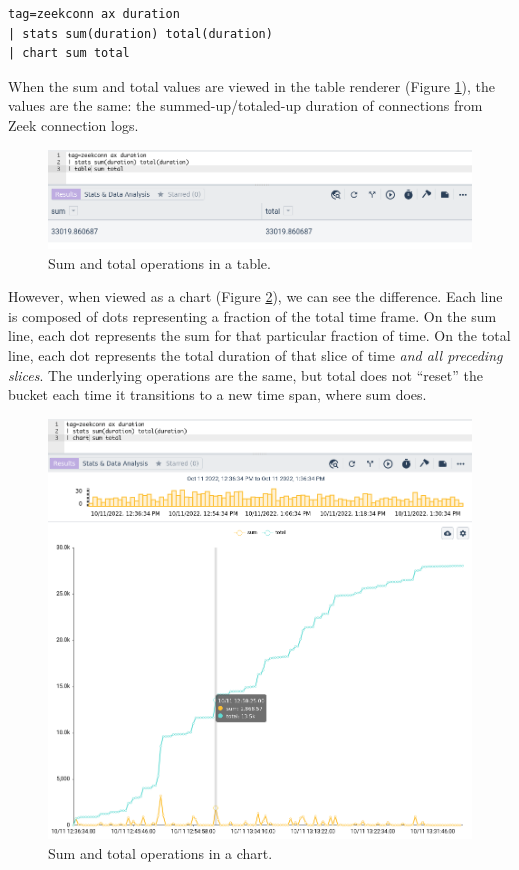 \begin{verbatim}
tag=zeekconn ax duration
| stats sum(duration) total(duration)
| chart sum total
\end{verbatim}

When the sum and total values are viewed in the table renderer (Figure \ref{fig:stats-total-table}), the values are the same: the summed-up/totaled-up duration of connections from Zeek connection logs. 

\begin{figure}
	\includegraphics[width=0.8\linewidth]{images/stats-total-table.png}
	\caption{Sum and total operations in a table.}
	\label{fig:stats-total-table}
\end{figure}

However, when viewed as a chart (Figure \ref{fig:stats-total-chart}), we can see the difference. Each line is composed of dots representing a fraction of the total time frame. On the sum line, each dot represents the sum for that particular fraction of time. On the total line, each dot represents the total duration of that slice of time \emph{and all preceding slices}. The underlying operations are the same, but total does not ``reset'' the bucket each time it transitions to a new time span, where sum does.

\begin{figure}
	\includegraphics[width=0.8\linewidth]{images/stats-total-chart.png}
	\caption{Sum and total operations in a chart.}
	\label{fig:stats-total-chart}
\end{figure}

